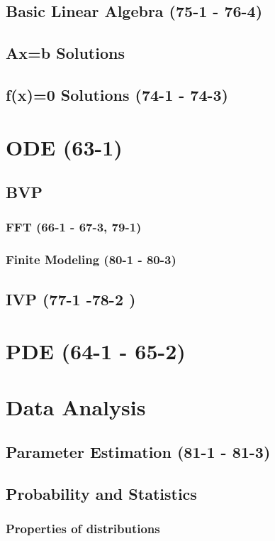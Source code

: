 \documentclass{mitqualif}
\begin{document}
\subsection{Basic Linear Algebra (75-1 - 76-4)}
\subsection{Ax=b Solutions}
\subsection{f(x)=0 Solutions (74-1 - 74-3)}
\section{ODE (63-1)}
\subsection{BVP}
\subsubsection{FFT (66-1 - 67-3, 79-1)}
\subsubsection{Finite Modeling (80-1 - 80-3)}
\subsection{IVP (77-1 -78-2 )}
\section{PDE (64-1 - 65-2)}
\section{Data Analysis}
\subsection{Parameter Estimation (81-1 - 81-3)}
\subsection{Probability and Statistics}
\subsubsection{Properties of distributions}
 


\newpage

\newpage
\printindex
\newpage
%
\end{document}
